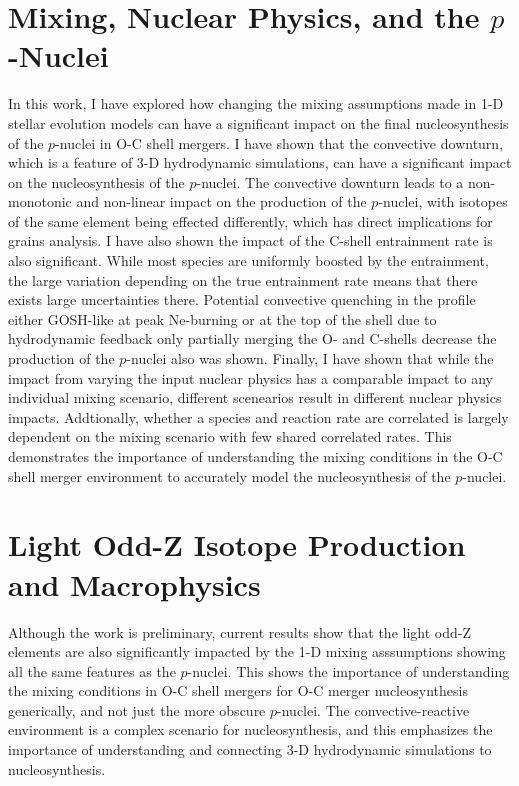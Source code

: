 \label{concl}

\section{Mixing, Nuclear Physics, and the \texorpdfstring{$p$}{p}-Nuclei}\label{sec:mixing_nuclear_pnuclei
}

In this work, I have explored how changing the mixing assumptions made in 1-D stellar evolution models can have a significant impact on the final nucleosynthesis of the $p$-nuclei in O-C shell mergers.
I have shown that the convective downturn, which is a feature of 3-D hydrodynamic simulations, can have a significant impact on the nucleosynthesis of the $p$-nuclei.
The convective downturn leads to a non-monotonic and non-linear impact on the production of the $p$-nuclei, with isotopes of the same element being effected differently, which has direct implications for grains analysis.
I have also shown the impact of the C-shell entrainment rate is also significant.
While most species are uniformly boosted by the entrainment, the large variation depending on the true entrainment rate means that there exists large uncertainties there.
Potential convective quenching in the profile either GOSH-like at peak Ne-burning or at the top of the shell due to hydrodynamic feedback only partially merging the O- and C-shells decrease the production of the $p$-nuclei also was shown.
Finally, I have shown that while the impact from varying the input nuclear physics has a comparable impact to any individual mixing scenario, different scenearios result in different nuclear physics impacts.
Addtionally, whether a species and reaction rate are correlated is largely dependent on the mixing scenario with few shared correlated rates.
This demonstrates the importance of understanding the mixing conditions in the O-C shell merger environment to accurately model the nucleosynthesis of the $p$-nuclei.

\section{Light Odd-Z Isotope Production and Macrophysics}\label{sec:lightoddZ_summary}

Although the work is preliminary, current results show that the light odd-Z elements are also significantly impacted by the 1-D mixing asssumptions showing all the same features as the $p$-nuclei.
This shows the importance of understanding the mixing conditions in O-C shell mergers for O-C merger nucleosynthesis generically, and not just the more obscure $p$-nuclei.
The convective-reactive environment is a complex scenario for nucleosynthesis, and this emphasizes the importance of understanding and connecting 3-D hydrodynamic simulations to nucleosynthesis.

